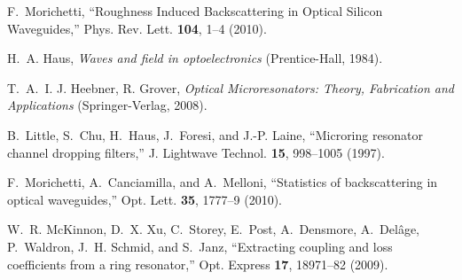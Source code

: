 \begin{thebibliography}{10}
F.~Morichetti, \enquote{{Roughness Induced Backscattering in Optical Silicon
  Waveguides},} Phys. Rev. Lett. \textbf{104}, 1--4 (2010).

H.~A. Haus, \emph{{Waves and field in optoelectronics}} (Prentice-Hall, 1984).

T.~A.~I. {J. Heebner, R. Grover}, \emph{{Optical Microresonators: Theory,
  Fabrication and Applications}} (Springer-Verlag, 2008).

B.~Little, S.~Chu, H.~Haus, J.~Foresi, and J.-P. Laine, \enquote{{Microring
  resonator channel dropping filters},} J. Lightwave Technol.
  \textbf{15}, 998--1005 (1997).

F.~Morichetti, A.~Canciamilla, and A.~Melloni, \enquote{{Statistics of
  backscattering in optical waveguides},} Opt. Lett. \textbf{35}, 1777--9
  (2010).

W.~R. McKinnon, D.~X. Xu, C.~Storey, E.~Post, A.~Densmore, A.~Del\^{a}ge,
  P.~Waldron, J.~H. Schmid, and S.~Janz, \enquote{{Extracting coupling and loss
  coefficients from a ring resonator},} Opt. Express \textbf{17}, 18971--82
  (2009).
\end{thebibliography}

